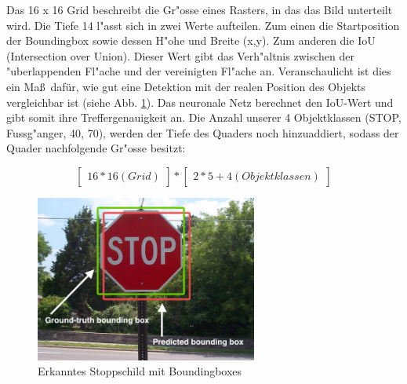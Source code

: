Das 16 x 16 Grid beschreibt die Gr"osse eines Rasters, in das das Bild unterteilt wird. Die Tiefe 14 l"asst sich in zwei Werte aufteilen. Zum einen die Startposition der Boundingbox sowie dessen H"ohe und Breite (x,y).  Zum anderen die IoU (Intersection over Union). Dieser Wert gibt das Verh"altnis zwischen der "uberlappenden Fl"ache und der vereinigten Fl"ache an. Veranschaulicht ist dies ein Ma\ss \ daf\"ur, wie gut eine Detektion mit der realen Position des Objekts vergleichbar ist (siehe Abb. \ref{fig:stoppschild}). Das neuronale Netz berechnet den IoU-Wert und gibt somit ihre Treffergenauigkeit an. Die Anzahl unserer 4 Objektklassen (STOP, Fussg"anger, 40, 70),  werden der Tiefe des Quaders noch hinzuaddiert,
sodass der Quader nachfolgende Gr"osse besitzt:


\begin{equation}
\begin{bmatrix}16 * 16 (Grid)\end{bmatrix} * \begin{bmatrix}2 * 5 + 4 (Objektklassen)\end{bmatrix}
\end{equation}

\begin{figure}[h]
	\centering
	\includegraphics[width=0.65\textwidth]{images/stoppschild}
	\caption{Erkanntes Stoppschild mit Boundingboxes}
	\label{fig:stoppschild}
\end{figure}

